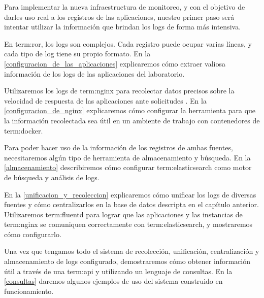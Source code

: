 Para implementar la nueva infraestructura de monitoreo, y con el objetivo de
darles uso real a los registros de las aplicaciones, nuestro primer paso será
intentar utilizar la información que brindan los logs de forma más intensiva.

En \gls{term:ror}, los logs son complejos. Cada registro puede ocupar varias
líneas, y cada tipo de log tiene su propio formato. En la
\autoref{configuracion_de_las_aplicaciones} explicaremos cómo extraer valiosa
información de los logs de las aplicaciones del laboratorio.

Utilizaremos los logs de \gls{term:nginx} para recolectar datos precisos sobre
la velocidad de respuesta de las aplicaciones ante solicitudes . En
la \autoref{configuracion_de_nginx} explicaremos cómo configurar la herramienta
para que la información recolectada sea útil en un ambiente de trabajo con
contenedores de \gls{term:docker}.

Para poder hacer uso de la información de los registros de ambas fuentes,
necesitaremos algún tipo de herramienta de almacenamiento y búsqueda. En la
\autoref{almacenamiento} describiremos cómo configurar \gls{term:elasticsearch}
como motor de búsqueda y análisis de logs.

En la \autoref{unificacion_y_recoleccion} explicaremos cómo unificar los logs
de diversas fuentes y cómo centralizarlos en la base de datos descripta en
el capítulo anterior. Utilizaremos \gls{term:fluentd} para lograr que las
aplicaciones y las instancias de \gls{term:nginx} se comuniquen correctamente
con \gls{term:elasticsearch}, y mostraremos cómo configurarlo.

Una vez que tengamos todo el sistema de recolección, unificación,
centralización y almacenamiento de logs configurado, demostraremos cómo obtener
información útil a través de una \gls{term:api} y utilizando un lenguaje de
consultas. En la \autoref{consultas} daremos algunos ejemplos de uso del
sistema construido en funcionamiento.
